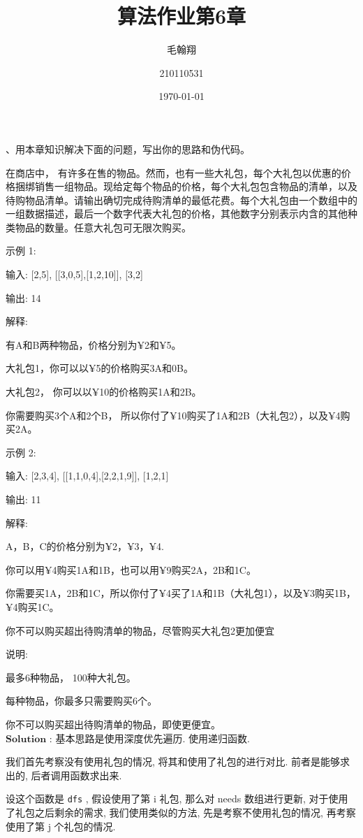 \documentclass[a4paper, 10pt]{ctexart} %
\title{算法作业第6章}
\author{毛翰翔 \and 210110531}
\date{\today}
\begin{document}
、用本章知识解决下面的问题，写出你的思路和伪代码。

	在商店中， 有许多在售的物品。然而，也有一些大礼包，每个大礼包以优惠的价格捆绑销售一组物品。现给定每个物品的价格，每个大礼包包含物品的清单，以及待购物品清单。请输出确切完成待购清单的最低花费。每个大礼包由一个数组中的一组数据描述，最后一个数字代表大礼包的价格，其他数字分别表示内含的其他种类物品的数量。任意大礼包可无限次购买。

示例 1:

输入: [2,5], [[3,0,5],[1,2,10]], [3,2]

输出: 14


解释: 

有A和B两种物品，价格分别为¥2和¥5。


大礼包1，你可以以¥5的价格购买3A和0B。

大礼包2， 你可以以¥10的价格购买1A和2B。

你需要购买3个A和2个B， 所以你付了¥10购买了1A和2B（大礼包2），以及¥4购买2A。

示例 2:

输入: [2,3,4], [[1,1,0,4],[2,2,1,9]], [1,2,1]

输出: 11

解释: 

A，B，C的价格分别为¥2，¥3，¥4.

你可以用¥4购买1A和1B，也可以用¥9购买2A，2B和1C。

你需要买1A，2B和1C，所以你付了¥4买了1A和1B（大礼包1），以及¥3购买1B， ¥4购买1C。

你不可以购买超出待购清单的物品，尽管购买大礼包2更加便宜

说明:



	最多6种物品， 100种大礼包。
    
	每种物品，你最多只需要购买6个。
    
	你不可以购买超出待购清单的物品，即使更便宜。
    \\[7pt]
$\mathbf{Solution}$ : 基本思路是使用深度优先遍历. 使用递归函数. 

我们首先考察没有使用礼包的情况, 将其和使用了礼包的进行对比. 前者是能够求出的, 后者调用函数求出来. 

设这个函数是 \verb|dfs| , 假设使用了第 i 礼包, 那么对 needs 数组进行更新, 对于使用了礼包之后剩余的需求, 我们使用类似的方法, 先是考察不使用礼包的情况, 再考察使用了第 j 个礼包的情况. 
\end{document}
